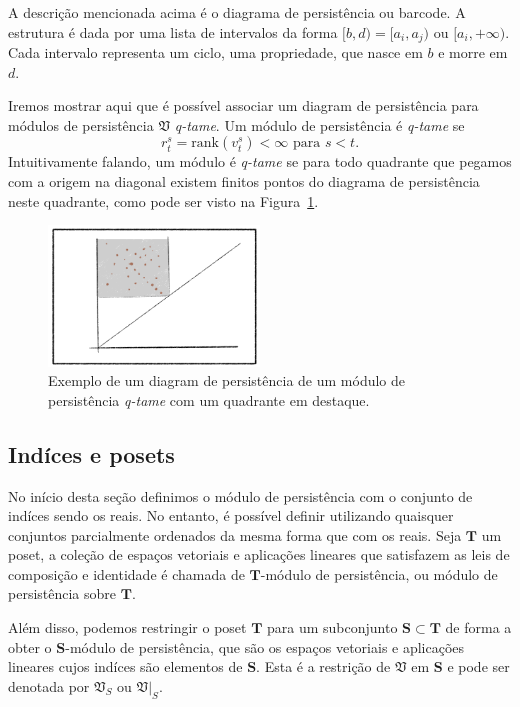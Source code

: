 A descrição mencionada acima é o diagrama de persistência ou barcode. A estrutura é dada por uma 
lista de intervalos da forma $[b,d) = [a_i, a_j)$ ou $[a_i, +\infty)$. Cada intervalo representa
um ciclo, uma propriedade, que nasce em $b$ e morre em $d$. 

Iremos mostrar aqui que é possível associar um diagram de persistência para módulos de 
persistência $\mathfrak{V}$ \textit{q-tame}. Um módulo de persistência é \textit{q-tame} 
se 
\begin{equation*}
    r_t^s = \text{rank}(v_t^s) < \infty \text{ para } s < t.
\end{equation*}
Intuitivamente falando, um módulo é \textit{q-tame} se para todo quadrante que pegamos com a origem
na diagonal existem finitos pontos do diagrama de persistência neste quadrante, como pode ser visto
na Figura~\ref{fig:quad_finito}.

\begin{figure}
    \centering
    \includegraphics[width=0.5\textwidth]{images/quad_finito.png}
    \caption{Exemplo de um diagram de persistência de um módulo de 
            persistência \textit{q-tame} com um quadrante em destaque.}
    \label{fig:quad_finito}
    \fautor
\end{figure}

\subsection{Indíces e posets} 
No início desta seção definimos o módulo de persistência com o conjunto de indíces sendo os reais. No 
entanto, é possível definir utilizando quaisquer conjuntos parcialmente ordenados da mesma forma que 
com os reais. Seja $\mathbf{T}$ um poset, a coleção de espaços vetoriais e aplicações lineares que 
satisfazem as leis de composição e identidade é chamada de $\mathbf{T}$-módulo de persistência, ou 
módulo de persistência sobre $\mathbf{T}$. 

Além disso, podemos restringir o poset $\mathbf{T}$ para um subconjunto $\mathbf{S} \subset \mathbf{T}$
de forma a obter o $\mathbf{S}$-módulo de persistência, que são os espaços vetoriais e aplicações lineares
cujos indíces são elementos de $\mathbf{S}$. Esta é a restrição de $\mathfrak{V}$ em $\mathbf{S}$ e pode
ser denotada por $\mathfrak{V}_S$ ou $\left.\mathfrak{V}\right|_S$. 


